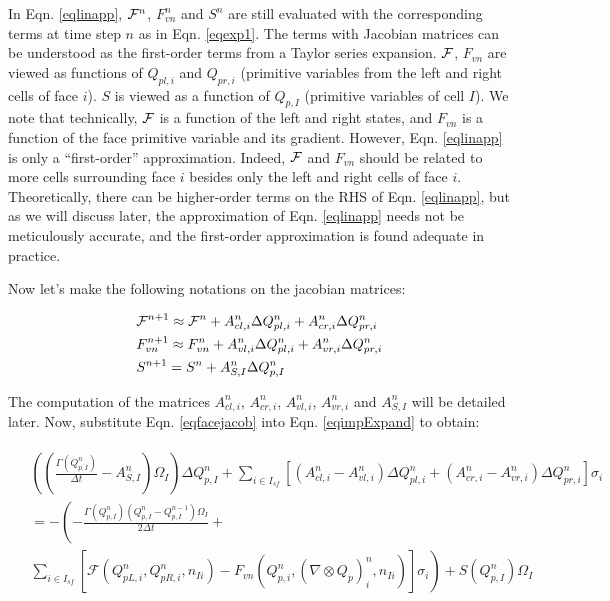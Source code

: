 \documentclass[12pt, letterpaper]{report}
\begin{document}
In Eqn. \ref{eqlinapp}, $\mathcal{F}^n$, $F_{vn}^n$ and $S^n$ are still evaluated with the corresponding
terms at time step $n$ as in Eqn. \ref{eqexp1}. The terms with Jacobian matrices can be understood
as the first-order terms from a Taylor series expansion. $\mathcal{F}$, $F_{vn}$ are viewed as functions of
$Q_{pl,i}$ and $Q_{pr,i}$ (primitive variables from the left and right cells of face $i$). $S$ is
viewed as a function of $Q_{p,I}$ (primitive variables of cell $I$). We note that technically, $\mathcal{F}$
is a function of the left and right states, and $F_{vn}$ is a function of the face primitive
variable and its gradient. However, Eqn. \ref{eqlinapp} is only a ``first-order'' approximation.
Indeed, $\mathcal{F}$ and $F_{vn}$ should be related to more cells surrounding face $i$ besides only the left
and right cells of face $i$. Theoretically, there can be higher-order terms on the RHS of Eqn.
\ref{eqlinapp}, but as we will discuss later, the approximation of Eqn. \ref{eqlinapp} needs not be
meticulously accurate, and the first-order approximation is found adequate in practice.
\paraspace

Now let's make the following notations on the jacobian matrices:

\begin{align}\label{eqfacejacob}
   \begin{split}
      &\mathcal{F}^{n+1} \approx \mathcal{F}^n + A_{cl,i}^n \Delta Q_{pl,i}^n + A_{cr,i}^n \Delta Q_{pr,i}^n \\
      &F_{vn}^{n+1} \approx F_{vn}^n + A_{vl,i}^n \Delta Q_{pl,i}^n + A_{vr,i}^n \Delta Q_{pr,i}^n \\
      &S^{n+1} = S^n + A_{S,I}^n \Delta Q_{p,I}^n
   \end{split}
\end{align}

The computation of the matrices $A_{cl,i}^n$, $A_{cr,i}^n$, $A_{vl,i}^n$, $A_{vr,i}^n$ and
$A_{S,I}^n$ will be detailed later. Now, substitute Eqn. \ref{eqfacejacob} into Eqn.
\ref{eqimpExpand} to obtain:

\begin{align}\label{eqimpExpand2}
   \begin{split}
   &\left(\left(\frac{\Gamma (Q_{p,I}^n)}{\Delta t} - A_{S,I}^n\right) \Omega_I\right) \Delta
   Q_{p,I}^n + \sum_{i \in I_{sf}} \left[ (A_{cl,i}^n - A_{vl,i}^n) \Delta Q_{pl,i}^n + ( A_{cr,i}^n
   - A_{vr,i}^n) \Delta Q_{pr,i}^n \right] \sigma_i \\
   &= -\left(-\frac{\Gamma(Q_{p,I}^n) (Q_{p,I}^n - Q_{p,I}^{n-1})\Omega_I}{2\Delta t} +
         \right.\\
      &\left.\sum_{i \in
            I_{sf}}\left[\mathcal{F}(Q_{pL,i}^n, Q_{pR,i}^n, n_{Ii}) - F_{vn}(Q_{p,i}^n, (\nabla
\mathop{\otimes} Q_p)_i^n, n_{Ii})\right]\sigma_i\right) + S(Q_{p,I}^n)\Omega_I
   \end{split}
\end{align}
\end{document}
